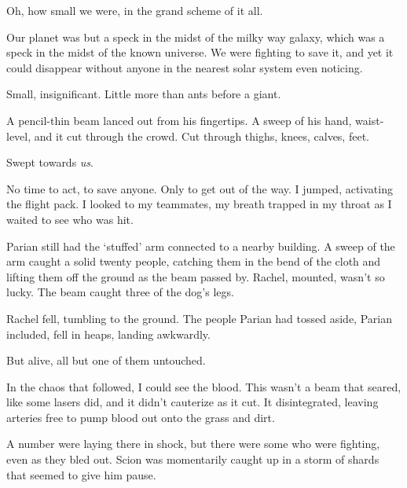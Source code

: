 





Oh, how small we were, in the grand scheme of it all.



Our planet was but a speck in the midst of the milky way galaxy, which was a speck in the midst of the known universe.  We were fighting to save it, and yet it could disappear without anyone in the nearest solar system even noticing.



Small, insignificant.  Little more than ants before a giant.



A pencil-thin beam lanced out from his fingertips.  A sweep of his hand, waist-level, and it cut through the crowd.  Cut through thighs, knees, calves, feet.



Swept towards \emph{us}.



No time to act, to save anyone.  Only to get out of the way.  I jumped, activating the flight pack.  I looked to my teammates, my breath trapped in my throat as I waited to see who was hit.



Parian still had the `stuffed' arm connected to a nearby building.  A sweep of the arm caught a solid twenty people, catching them in the bend of the cloth and lifting them off the ground as the beam passed by.  Rachel, mounted, wasn't so lucky.  The beam caught three of the dog's legs.



Rachel fell, tumbling to the ground.  The people Parian had tossed aside, Parian included, fell in heaps, landing awkwardly.



But alive, all but one of them untouched.



In the chaos that followed, I could see the blood.  This wasn't a beam that seared, like some lasers did, and it didn't cauterize as it cut.  It disintegrated, leaving arteries free to pump blood out onto the grass and dirt.



A number were laying there in shock, but there were some who were fighting, even as they bled out.  Scion was momentarily caught up in a storm of shards that seemed to give him pause.



